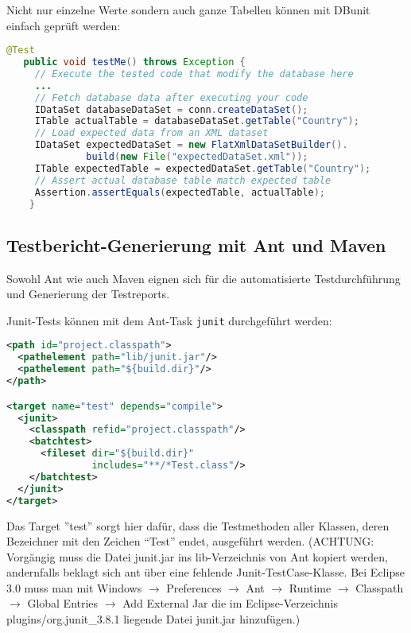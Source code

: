 \newslide
Nicht nur einzelne Werte sondern
auch ganze Tabellen können mit DBunit einfach geprüft werden:
\begin{lstlisting}[language=java]
   @Test
   public void testMe() throws Exception {
     // Execute the tested code that modify the database here
     ...
     // Fetch database data after executing your code
     IDataSet databaseDataSet = conn.createDataSet();
     ITable actualTable = databaseDataSet.getTable("Country");
     // Load expected data from an XML dataset
     IDataSet expectedDataSet = new FlatXmlDataSetBuilder().
              build(new File("expectedDataSet.xml"));
     ITable expectedTable = expectedDataSet.getTable("Country");
     // Assert actual database table match expected table
     Assertion.assertEquals(expectedTable, actualTable);
    }
\end{lstlisting}
%
%
\subsection{Testbericht-Generierung mit Ant und Maven}
Sowohl Ant wie auch Maven eignen sich für die automatisierte
Testdurchführung und Generierung der Testreports.

Junit-Tests können mit dem Ant-Task \verb+junit+ durchgeführt werden:
\begin{lstlisting}[language=xml,
  morekeywords={target,path,pathelement,junit,classpath,batchtest,fileset}]
<path id="project.classpath">
  <pathelement path="lib/junit.jar"/>
  <pathelement path="${build.dir}"/>
</path>

<target name="test" depends="compile">
  <junit>
    <classpath refid="project.classpath"/>
    <batchtest>
      <fileset dir="${build.dir}"
               includes="**/*Test.class"/>
    </batchtest>
  </junit>
</target>
\end{lstlisting}
Das Target ''test'' sorgt hier dafür, dass die Testmethoden aller Klassen,
deren Bezeichner mit den Zeichen ``Test'' endet, ausgeführt werden.
\ifslides
\else
(ACHTUNG: Vorgängig muss die Datei junit.jar ins lib-Verzeichnis von Ant
kopiert werden, andernfalls beklagt sich ant über eine fehlende
Junit-TestCase-Klasse. Bei Eclipse 3.0 muss man mit
Windows $\longrightarrow$ Preferences $\longrightarrow$ Ant $\longrightarrow$
 Runtime
  $\longrightarrow$ Classpath $\longrightarrow$
                Global Entries $\longrightarrow$ Add External Jar
die im Eclipse-Verzeichnis
  plugins/org.junit\_3.8.1
liegende Datei junit.jar  hinzufügen.)
\fi

